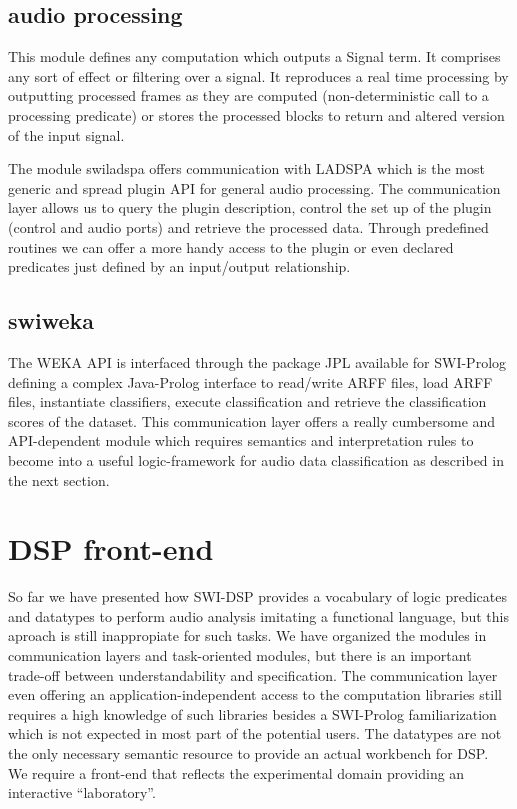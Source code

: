 \documentclass[runningheads]{llncs}
\begin{document}
\subsection{audio processing}\label{subsec:swilasdpa}

This module defines any computation which outputs a Signal term. It comprises any sort of effect or filtering over a signal. It reproduces a real time processing by outputting processed frames as they are computed (non-deterministic call to a processing predicate) or stores the processed blocks to return and altered version of the input signal. 

The module swiladspa offers communication with LADSPA which is the most generic and spread plugin API for general audio processing. The communication layer allows us to query the plugin description, control the set up of the plugin (control and audio ports) and retrieve the processed data. Through predefined routines we can offer a more handy access to the plugin or even declared predicates just defined by an input/output relationship.

\subsection{swiweka}\label{subsec:swiweka}

The WEKA API is interfaced through the package JPL available for SWI-Prolog defining a complex Java-Prolog interface to read/write ARFF files, load ARFF files, instantiate classifiers, execute classification and retrieve the classification scores of the dataset. This communication layer offers a really cumbersome and API-dependent module which requires semantics and interpretation rules to become into a useful logic-framework for audio data classification as described in the next section.

\section{DSP front-end}\label{sec:frontend}

So far we have presented how SWI-DSP provides a vocabulary of logic predicates and datatypes to perform audio analysis imitating a functional language, but this aproach is still inappropiate for such tasks. We have organized the modules in communication layers and task-oriented modules, but there is an important trade-off between understandability and specification. The communication layer even offering an application-independent access to the computation libraries still requires a high knowledge of such libraries besides a SWI-Prolog familiarization which is not expected in most part of the potential users. The datatypes are not the only necessary semantic resource to provide an actual workbench for DSP. We require a front-end that reflects the experimental domain providing an interactive ``laboratory''.
\end{document}
